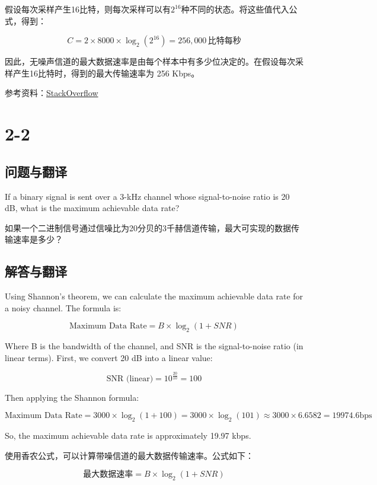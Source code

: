 假设每次采样产生16比特，则每次采样可以有\(2^{16}\)种不同的状态。将这些值代入公式，得到：

\[
C = 2 \times 8000 \times \log_2(2^{16}) = 256,000 \, \text{比特每秒}
\]

因此，无噪声信道的最大数据速率是由每个样本中有多少位决定的。在假设每次采样产生16比特时，得到的最大传输速率为 256 Kbps。

参考资料：\href{https://electronics.stackexchange.com/questions/94822/does-nyquist-rate-depend-on-the-sampling-rate}{StackOverflow}
\section{2-2}

\subsection{问题与翻译}

If a binary signal is sent over a 3-kHz channel whose signal-to-noise ratio is 20 dB, what is the maximum achievable data rate?

如果一个二进制信号通过信噪比为20分贝的3千赫信道传输，最大可实现的数据传输速率是多少？

\subsection{解答与翻译}

Using Shannon’s theorem, we can calculate the maximum achievable data rate for a noisy channel. The formula is:

\[
\text{Maximum Data Rate} = B \times \log_2(1 + SNR)
\]

Where B is the bandwidth of the channel, and SNR is the signal-to-noise ratio (in linear terms). First, we convert 20 dB into a linear value:

\[
\text{SNR (linear)} = 10^{\frac{20}{10}} = 100
\]

Then applying the Shannon formula:

\[
\text{Maximum Data Rate} = 3000 \times \log_2(1 + 100) = 3000 \times \log_2(101) \approx 3000 \times 6.6582 = 19974.6 \text{bps}
\]

So, the maximum achievable data rate is approximately 19.97 kbps.

\vspace{10pt}

使用香农公式，可以计算带噪信道的最大数据传输速率。公式如下：

\[
\text{最大数据速率} = B \times \log_2(1 + SNR)
\]

